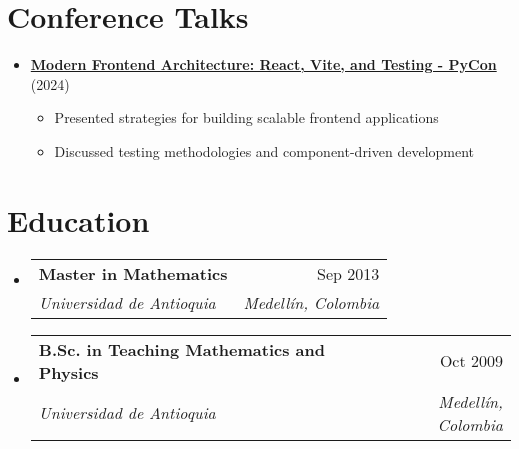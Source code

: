 \documentclass[letterpaper,11pt]{article}
\makeatletter
\newcommand{\resumeSubheading}[4]{
  \vspace{-2pt}
  \item[]
  \begin{tabular*}{\textwidth}{@{\extracolsep{\fill}}l r}
    \textbf{#1} & #2 \\
    \textit{#3} & \textit{#4} \\
  \end{tabular*}
  \vspace{-5pt}
}
\makeatother
\begin{document}
\section{Conference Talks}
\begin{itemize}[leftmargin=*]
    \item \textbf{\href{https://www.youtube.com/watch?v=m4hP1soE414}{Modern Frontend Architecture: React, Vite, and Testing - PyCon \faYoutube}} (2024)
    \begin{itemize}
        \item Presented strategies for building scalable frontend applications
        \item Discussed testing methodologies and component-driven development
    \end{itemize}
\end{itemize}

\section{Education}
\begin{itemize}[leftmargin=0pt, itemindent=0pt, label={}]
\resumeSubheading
{Master in Mathematics}{Sep 2013}
{Universidad de Antioquia}{Medellín, Colombia}

\resumeSubheading
{B.Sc. in Teaching Mathematics and Physics}{Oct 2009}
{Universidad de Antioquia}{Medellín, Colombia}
\end{itemize}
\end{document}
